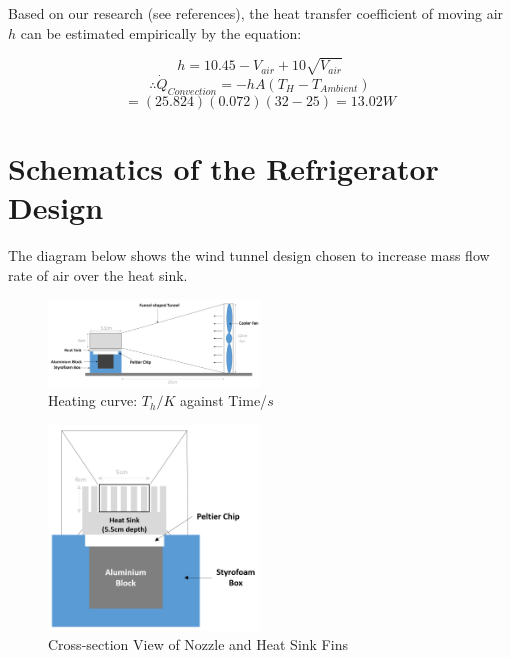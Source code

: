 \documentclass[12pt,a4paper]{IEEEtran}
\begin{document}
	Based on our research (see references), the heat transfer coefficient of moving air $h$ can be estimated empirically by the equation:
	
	$$h = 10.45 - V_{air} + 10\sqrt{V_{air}}$$
	$$\therefore \dot{Q}_{Convection} = -hA(T_{H}-T_{Ambient})$$
	$$=(25.824)(0.072)(32-25)=13.02W$$	
	
	
	
	
	\newpage
	\section{Schematics of the Refrigerator Design}
	The diagram below shows the wind tunnel design chosen to increase mass flow rate of air over the heat sink.
	\begin{figure}[H]
		\includegraphics[width=0.5\textwidth]{tunnel_side_view.png}
		\begin{center}
			\caption{Heating curve: $T_h/K$ against Time/$s$}
			\label{fig:side_view}
		\end{center}
	\end{figure}
	\begin{figure}[H]
		\begin{center}
			\includegraphics[width=0.5\textwidth]{cross_section_heatSink.png}
			\caption{Cross-section View of Nozzle and Heat Sink Fins}
			\label{fig:cross_section}
		\end{center}
	\end{figure} \pagebreak
	
\end{document}

